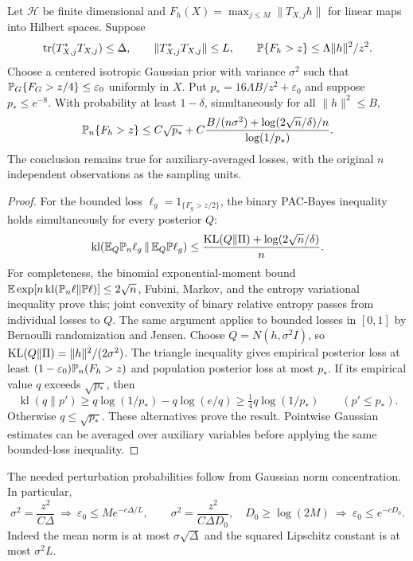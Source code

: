 \begin{lemma}\label{lem:gaussian-pac}
Let $\mathcal H$ be finite dimensional and
$F_h(X)=\max_{j\le M}\|T_{X,j}h\|$ for linear maps into Hilbert spaces.
Suppose
\[
 \operatorname{tr}(T_{X,j}^*T_{X,j})\le\Delta,
 \qquad \|T_{X,j}^*T_{X,j}\|\le L,
 \qquad \mathbb P\{F_h>z\}\le\Lambda\|h\|^2/z^2.
\]
Choose a centered isotropic Gaussian prior with variance $\sigma^2$ such
that $\mathbb P_G\{F_G>z/4\}\le\varepsilon_0$ uniformly in $X$.
Put $p_*=16\Lambda B/z^2+\varepsilon_0$ and suppose $p_*\le e^{-8}$.
With probability at least $1-\delta$, simultaneously for all
$\|h\|^2\le B$,
\[
 \mathbb P_n\{F_h>z\}\le C\sqrt{p_*}
 +C\frac{B/(n\sigma^2)+\log(2\sqrt n/\delta)/n}
              {\log(1/p_*)}.
\]
The conclusion remains true for auxiliary-averaged losses, with the
original $n$ independent observations as the sampling units.
\end{lemma}
\begin{proof}
For the bounded loss $\ell_g=1_{\{F_g>z/2\}}$, the binary PAC-Bayes
inequality holds simultaneously for every posterior $Q$:
\[
 \operatorname{kl}(\mathbb E_Q\mathbb P_n\ell_g\,\|\,\mathbb E_Q\mathbb P\ell_g)
 \le\frac{\operatorname{KL}(Q\|\Pi)+\log(2\sqrt n/\delta)}n.
\]
For completeness, the binomial exponential-moment bound
$\mathbb E\exp[n\operatorname{kl}(\mathbb P_n\ell\|\mathbb P\ell)]\le2\sqrt n$,
Fubini, Markov, and the entropy variational inequality prove this;
joint convexity of binary relative entropy passes from individual
losses to $Q$. The same argument applies to bounded losses in $[0,1]$
by Bernoulli randomization and Jensen.
Choose $Q=N(h,\sigma^2I)$, so $\operatorname{KL}(Q\|\Pi)=\|h\|^2/(2\sigma^2)$.
The triangle inequality gives empirical posterior loss at least
$(1-\varepsilon_0)\mathbb P_n(F_h>z)$ and population posterior loss at most
$p_*$. If its empirical value $q$ exceeds $\sqrt{p_*}$, then
\[
 \operatorname{kl}(q\|p')\ge q\log(1/p_*)
                 -q\log(e/q)
 \ge\tfrac14q\log(1/p_*)\qquad(p'\le p_*).
\]
Otherwise $q\le\sqrt{p_*}$. These alternatives prove the result.
Pointwise Gaussian estimates can be averaged over auxiliary variables
before applying the same bounded-loss inequality.
\end{proof}

The needed perturbation probabilities follow from Gaussian norm
concentration. In particular,
\begin{equation}\label{eq:gaussian-noise-options}
 \sigma^2=\frac{z^2}{C\Delta}
 \ \Longrightarrow\ 
 \varepsilon_0\le M e^{-c\Delta/L},\qquad
 \sigma^2=\frac{z^2}{C\Delta D_0},\quad D_0\ge\log(2M)
 \ \Longrightarrow\ 
 \varepsilon_0\le e^{-cD_0}.
\end{equation}
Indeed the mean norm is at most $\sigma\sqrt\Delta$ and the squared
Lipschitz constant is at most $\sigma^2L$.

